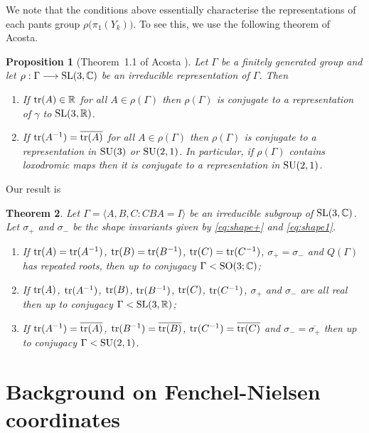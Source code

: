\documentclass[11pt]{amsart}
\newtheorem{theorem}{Theorem}[section]
\newtheorem{proposition}[theorem]{Proposition}
\numberwithin{equation}{section}
\begin{document}
We note that the conditions above essentially characterise the representations of each pants group $\rho\bigl(\pi_1(Y_k)\bigr)$.
To see this, we use the following theorem of Acosta.

\begin{proposition}[Theorem~1.1 of Acosta \cite{Aco}]\label{prop:acosta}
Let $\Gamma$ be a finitely generated group and let $\rho:\Gamma\longrightarrow {\rm SL}(3,{\mathbb C})$ be an
irreducible representation of $\Gamma$. Then
\begin{enumerate}
\item[(1)] If ${\rm tr}(A)\in{\mathbb R}$ for all $A\in\rho(\Gamma)$ then $\rho(\Gamma)$ is conjugate to a representation
of $\gamma$ to ${\rm SL}(3,{\mathbb R})$.
\item[(2)] If ${\rm tr}(A^{-1})=\overline{{\rm tr}(A)}$ for all $A\in\rho(\Gamma)$ then $\rho(\Gamma)$ is conjugate to a
representation in ${\rm SU}(3)$ or ${\rm SU}(2,1)$. In particular, if $\rho(\Gamma)$ contains loxodromic maps then it
is conjugate to a representation in ${\rm SU}(2,1)$.
\end{enumerate}
\end{proposition}

Our result is

\begin{theorem}\label{thm-pants}
Let $\Gamma=\langle A,B,C : CBA=I\rangle$ be an irreducible subgroup of ${\rm SL}(3,{\mathbb C})$.
Let $\sigma_+$ and $\sigma_-$ be the shape invariants given by \eqref{eq:shape+} and
\eqref{eq:shape1}. 
\begin{enumerate}
\item[(1)] If ${\rm tr}(A)={\rm tr}(A^{-1})$, ${\rm tr}(B)={\rm tr}(B^{-1})$, ${\rm tr}(C)={\rm tr}(C^{-1})$, 
$\sigma_+=\sigma_-$ and $Q(\Gamma)$ has repeated roots, then up to conjugacy $\Gamma<{\rm SO}(3;{\mathbb C})$;
\item[(2)] If ${\rm tr}(A)$, ${\rm tr}(A^{-1})$, ${\rm tr}(B)$, ${\rm tr}(B^{-1})$, ${\rm tr}(C)$, ${\rm tr}(C^{-1})$, 
$\sigma_+$ and $\sigma_-$ are all real then up to conjugacy $\Gamma<{\rm SL}(3,{\mathbb R})$;
\item[(3)] If ${\rm tr}(A^{-1})=\overline{{\rm tr}(A)}$, ${\rm tr}(B^{-1})=\overline{{\rm tr}(B)}$, ${\rm tr}(C^{-1})=\overline{{\rm tr}(C)}$
and $\sigma_-=\overline{\sigma_+}$ then up to conjugacy $\Gamma<{\rm SU}(2,1)$.
\end{enumerate}
\end{theorem}


\section{Background on Fenchel-Nielsen coordinates}
\end{document}
